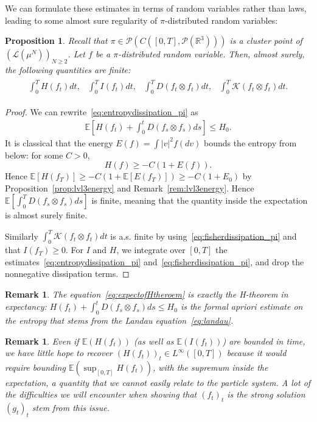 \documentclass[11pt,a4paper]{article}
\theoremstyle{definition}
\theoremstyle{plain}
\newtheorem{prop}[defi]{Proposition}
\newtheorem{remark}[defi]{Remark}
\begin{document}
We can formulate these estimates in terms of random variables rather than laws, leading to some almost sure regularity of $\pi$-distributed random variables:
\begin{prop}
    \label{prop:level3estimatesforf}
    Recall that $\pi \in \mathcal{P}\left(C([0,T],\mathcal{P}(\mathbb{R}^3)) \right)$ is a cluster point of $\left(\mathcal{L}\left( \mu^N\right) \right)_{N\geq 2 }$. Let $f$ be a $\pi$-distributed random variable. Then, almost surely, the following quantities are finite:
    \begin{align*}
    \begin{array}{cccc}
        \int_0^T H(f_t)dt, &  \int_0^T I(f_t)dt, & \int_0^T D(f_t\otimes f_t)dt, & \int_0^T \mathcal{K}(f_t\otimes f_t)dt.
    \end{array}
    \end{align*}
\end{prop}
\begin{proof}
    We can rewrite~\eqref{eq:entropydissipation_pi} as
    \begin{align}
    \label{eq:expectofHtheroem}
    \mathbb{E}\left[H(f_t)+\int_0^t D(f_s\otimes f_s)ds\right]\leq H_0.
    \end{align}
    It is classical \cite[Lemma 3.1]{HaurayMischler2012} that the energy $E(f)=\int \vert v \vert^2f(dv)$ bounds the entropy from below: for some $C>0$,
    $$H(f)\geq -C(1+E(f)).$$
    Hence $\mathbb{E}[H(f_T)]\geq -C(1+\mathbb{E}[E(f_T)])\geq -C(1+E_0)$ by Proposition~\ref{prop:lvl3energy} and Remark~\ref{rem:lvl3energy}. Hence $\mathbb{E}\left[\int_0^T D(f_s\otimes f_s)ds\right]$ is finite, meaning that the quantity inside the expectation is almost surely finite.
    
    Similarly
    $\int_0^T \mathcal{K}(f_t\otimes f_t)dt$ is a.s. finite by using~\eqref{eq:fisherdissipation_pi} and that $I(f_T)\geq 0$. For $I$ and $H$, we integrate over $[0,T]$ the estimates~\eqref{eq:entropydissipation_pi} and~\eqref{eq:fisherdissipation_pi}, and drop the nonnegative dissipation terms.
\end{proof}
\begin{remark}
    The equation~\eqref{eq:expectofHtheroem} is exactly the H-theorem in expectancy: $H(f_t)+\int_0^t D(f_s\otimes f_s)ds \leq H_0$ is the formal apriori estimate on the entropy that stems from the Landau equation~\eqref{eq:landau}.
\end{remark}
\begin{remark}
    Even if $\mathbb{E}(H(f_t))$ (as well as $\mathbb{E}(I(f_t))$) are bounded in time, we have little hope to recover $(H(f_t))_t\in L^\infty([0,T])$ because it would require bounding $\mathbb{E}(\sup_{[0,T]} H(f_t))$, with the supremum inside the expectation, a quantity that we cannot easily relate to the particle system. A lot of the difficulties we will encounter when showing that $(f_t)_t$ is the strong solution $(g_t)_t$ stem from this issue.
\end{remark}
\end{document}
